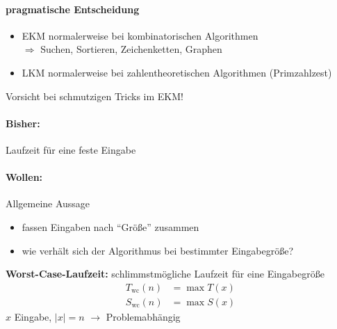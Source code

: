 \paragraph*{pragmatische Entscheidung}
\begin{itemize}
\item   EKM normalerweise bei kombinatorischen Algorithmen\\
        $\Rightarrow$ Suchen, Sortieren, Zeichenketten, Graphen
\item   LKM normalerweise bei zahlentheoretischen Algorithmen (Primzahlzest)
\end{itemize}
Vorsicht bei schmutzigen Tricks im EKM!

\paragraph*{Bisher:} Laufzeit für eine feste Eingabe
\paragraph*{Wollen:} Allgemeine Aussage
\begin{itemize}\renewcommand{\labelitemi}{$\hookrightarrow$}
\item   fassen Eingaben nach "`Größe"' zusammen
\item   wie verhält sich der Algorithmus bei bestimmter Eingabegröße?
\end{itemize}
\textbf{Worst-Case-Laufzeit:} schlimmstmögliche Laufzeit für eine Eingabegröße
\begin{align*}
T_{\text{wc}}(n) &= \max T(x) \\
S_{\text{wc}}(n) &= \max S(x)
\end{align*}
$x$ Eingabe, $|x| = n$ $\rightarrow$ Problemabhängig




